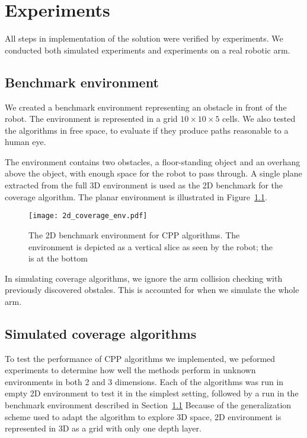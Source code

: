 \documentclass[buriama8_dp.tex]{subfiles}
\begin{document}
\chapter{Experiments}

All steps in implementation of the solution were verified by experiments. We conducted both simulated experiments and experiments on a real robotic arm.

\section{Benchmark environment}
\label{sec:exp_cpp_env}

We created a benchmark environment representing an obstacle in front of the robot. The environment is represented in a grid \(10 \times 10 \times 5\) cells. We also tested the algorithms in free space, to evaluate if they produce paths reasonable to a human eye.

The environment contains two obstacles, a floor-standing object and an overhang above the object, with enough space for the robot to pass through. A single plane extracted from the full 3D environment is used as the 2D benchmark for the coverage algorithm. The planar environment is illustrated in Figure~\ref{fig:2d_env}.

\begin{figure}[htp]
  \centering
  \texttt{[image: 2d\_coverage\_env.pdf]}
  \caption[2D benchmark environment]{The 2D benchmark environment for CPP algorithms. The environment is depicted as a vertical slice as seen by the robot; the  is at the bottom}
  \label{fig:2d_env}
\end{figure}

In simulating coverage algorithms, we ignore the arm collision checking with previously discovered obstales. This is accounted for when we simulate the whole arm.

\section{Simulated coverage algorithms}
\label{sec:exp_sim_coverage}

To test the performance of CPP algorithms we implemented, we peformed experiments to determine how well the methods perform in unknown environments in both 2 and 3 dimensions. Each of the algorithms was run in  empty 2D environment to test it in the simplest setting, followed by a run in the benchmark environment described in Section~\ref{sec:exp_cpp_env} Because of the generalization scheme used to adapt the algorithm to explore 3D space, 2D environment is represented in 3D as a grid with only one depth layer.
\end{document}
